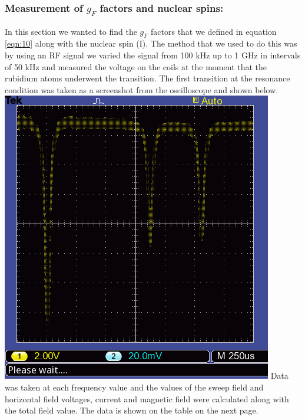 \documentclass[twocolumn]{article}
\begin{document}
\subsubsection{Measurement of $g_F$ factors and nuclear spins:}
In this section we wanted to find the $g_F$ factors that we defined in equation 
\ref{eqn:10} along with the nuclear spin (I). The method that we used to do 
this was by using an RF signal we varied the signal from 100 kHz up to 1 GHz in 
intervals of 50 kHz and measured the voltage on the coils at the moment that 
the rubidium atoms underwent the transition. The first transition at the 
resonance condition was taken as a screenshot from the oscilloscope and shown 
below.
\center
\includegraphics[width=\linewidth]{pictures/low-field-resonance.png}
\label{fig:23}
\justify
Data was taken at each frequency value and the values of the sweep field and 
horizontal field voltages, current and magnetic field were calculated along 
with the total field value. The data is shown on the table on the next page.
\end{document}

